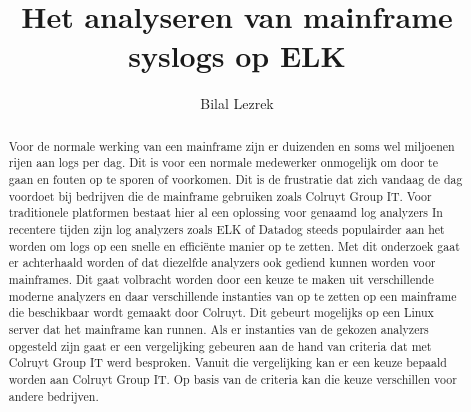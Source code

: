 \documentclass{hogent-article}
\title{Het analyseren van mainframe syslogs op ELK}
\author{Bilal Lezrek}
\begin{document}
\begin{abstract}
Voor de normale werking van een mainframe zijn er duizenden en soms wel miljoenen rijen aan logs per dag. Dit is voor een normale medewerker onmogelijk om door te gaan en fouten op te sporen of voorkomen. Dit is de frustratie dat zich vandaag de dag voordoet bij bedrijven die de mainframe gebruiken zoals Colruyt Group IT. Voor traditionele platformen bestaat hier al een oplossing voor genaamd log analyzers In recentere tijden zijn log analyzers zoals ELK of Datadog steeds populairder aan het worden om logs op een snelle en efficiënte manier op te zetten. Met dit onderzoek gaat er achterhaald worden of dat diezelfde analyzers ook gediend kunnen worden voor mainframes. Dit gaat volbracht worden door een keuze te maken uit verschillende moderne analyzers en daar verschillende instanties van op te zetten op een mainframe die beschikbaar wordt gemaakt door Colruyt. Dit gebeurt mogelijks op een Linux server dat het mainframe kan runnen. Als er instanties van de gekozen analyzers opgesteld zijn gaat er een vergelijking gebeuren aan de hand van criteria dat met Colruyt Group IT werd besproken. Vanuit die vergelijking kan er een keuze bepaald worden aan Colruyt Group IT. Op basis van de criteria kan die keuze verschillen voor andere bedrijven.\end{abstract}

\tableofcontents



\clearpage



\printbibliography[heading=bibintoc]
\end{document}
